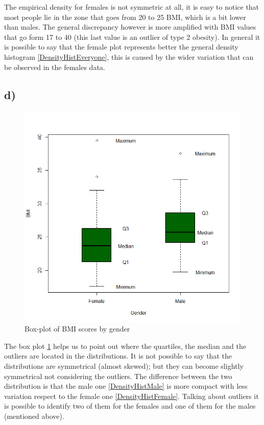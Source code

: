 The empirical density for females is not symmetric at all, it is easy to notice that most people lie in the zone that goes from 20 to 25 BMI, which is a bit lower than males. The general discrepancy however is more amplified with BMI values that go form 17 to 40 (this last value is an outlier of type 2 obesity). In general it is possible to say that the female plot represents better the general density histogram \ref{DensityHistEveryone}, this is caused by the wider variation that can be observed in the females data.
\newpage

\subsection{d)}
\begin{figure}[h!]
    \centering
    \includegraphics[scale=0.5]{root/Rplot3.png}
    \caption{Box-plot of BMI scores by gender}
    \label{Boxplot}
\end{figure}
The box plot \ref{Boxplot} helps us to point out where the quartiles, the median and the outliers are located in the distributions. It is not possible to say that the distributions are symmetrical (almost skewed); but they can become slightly symmetrical not considering the outliers. The difference between the two distribution is that the male one \ref{DensityHistMale} is more compact with less variation respect to the female one \ref{DensityHistFemale}. Talking about outliers it is possible to identify two of them for the females and one of them for the males (mentioned above).
\newpage


